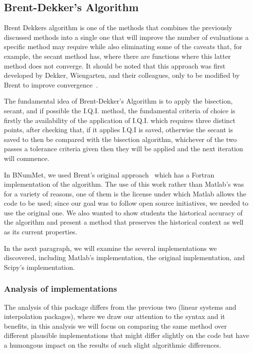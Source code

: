 \subsection{Brent-Dekker's Algorithm}
Brent Dekkers algorithm is one of the methods that combines the previously discussed methods into a single one that will improve the number of evaluations a specific method may require while also eliminating some of the caveats that, for example, the secant method has, where there are functions where this latter method does not converge.  It should be noted that this approach was first developed by Dekker, Wiengarten, and their colleagues, only to be modified by Brent to improve convergence~\cite{brent2002algorithms}. 

The fundamental idea of Brent-Dekker's Algorithm is to apply the bisection, secant, and if possible the I.Q.I. method, the fundamental criteria of choice is firstly the availability of the application of I.Q.I. which requires three distinct points, after checking that, if it applies I.Q.I is saved, otherwise the secant is saved to then be compared with the bisection algorithm, whichever of the two passes a tolerance criteria given then they will be applied and the next iteration will commence.


In BNumMet, we used Brent's original approach~\cite{Press2007} which has a Fortran implementation of the algorithm. The use of this work rather than Matlab's was for a variety of reasons, one of them is the license under which Matlab allows the code to be used; since our goal was to follow open source initiatives, we needed to use the original one. We also wanted to show students the historical accuracy of the algorithm and present a method that preserves the historical context as well as its current properties. 

In the next paragraph, we will examine the several implementations we discovered, including Matlab's implementation, the original implementation, and Scipy's implementation.

\subsubsection{Analysis of implementations}
The analysis of this package differs from the previous two (linear systems and interpolation packages), where we draw our attention to the syntax and it benefits, in this analysis we will focus on comparing the same method over different plausible implementations that might differ slightly on the code but have a humongous impact on the results of such slight algorithmic differences.

